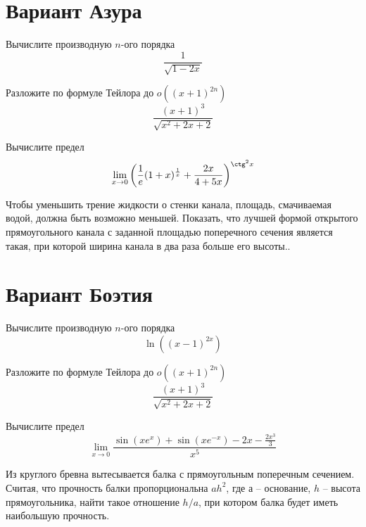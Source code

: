 \documentclass[russian]{article}
\begin{document}
\section*{Вариант Азура}

Вычислите производную $n$-ого порядка
$$\frac{1}{\sqrt{1 - 2x}}$$

Разложите по формуле Тейлора до $o((x + 1)^{2n})$
$$\frac{(x + 1)^3}{\sqrt{x^2 + 2x + 2}}$$

Вычислите предел
$$\lim_{x \to 0} \left(\frac{1}{e}(1 + x)^{\frac{1}{x}} + \frac{2x}{4 + 5x}\right)^{\ctg^2 x} $$

Чтобы уменьшить трение жидкости о стенки канала, площадь, смачиваемая водой, должна быть возможно меньшей. Показать, что лучшей формой открытого прямоугольного канала с заданной площадью поперечного сечения является такая, при которой ширина канала в два раза больше его высоты..

\vspace{1cm}
\begin{center}
\end{center}
\newpage

\section*{Вариант Боэтия}

Вычислите производную $n$-ого порядка
$$\ln \left((x - 1)^{2x}\right)$$

Разложите по формуле Тейлора до $o((x + 1)^{2n})$
$$\frac{(x + 1)^3}{\sqrt{x^2 + 2x + 2}}$$

Вычислите предел
$$\lim_{x \to 0}\frac{\sin(xe^x) + \sin (xe^{-x}) - 2x - \frac{2x^3}{3}}{x^5}$$

Из круглого бревна вытесывается балка с прямоугольным поперечным сечением. Считая, что прочность балки пропорциональна $ah^2$, где $а$ -- основание, $h$ -- высота прямоугольника, найти такое отношение $h/a$, при котором балка будет иметь наибольшую прочность.

\vspace{1cm}
\begin{center}
\end{center}
\newpage
\end{document}
